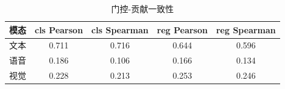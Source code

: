 \begin{table}[htbp]
  \centering
  \caption{门控-贡献一致性}
  \label{tab:p3-gphi}
  \begin{tabularx}{\textwidth}{@{}Xcccc@{}}
    \toprule
    模态 & cls Pearson & cls Spearman & reg Pearson & reg Spearman \\
    \midrule
    文本 & 0.711 & 0.716 & 0.644 & 0.596 \\
    语音 & 0.186 & 0.106 & 0.166 & 0.134 \\
    视觉 & 0.228 & 0.213 & 0.253 & 0.246 \\
    \bottomrule
  \end{tabularx}
\end{table}
